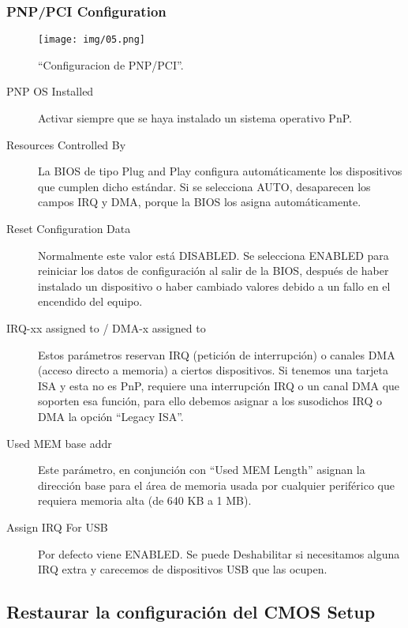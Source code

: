 		\subsubsection{PNP/PCI Configuration}{\label{sub:pnp/pci configuration}}
			\begin{figure}[H]
				\centering
					\texttt{[image: img/05.png]}
				\caption{``Configuracion de PNP/PCI''.}
			\end{figure}
			\begin{description}
				\item[PNP OS Installed] Activar siempre que se haya instalado un
					sistema operativo PnP. 
				\item[Resources Controlled By] La BIOS de tipo Plug and Play
					configura automáticamente los dispositivos que cumplen
					dicho estándar. Si se selecciona AUTO, desaparecen los
					campos IRQ y DMA, porque la BIOS los asigna
					automáticamente.
				\item[Reset Configuration Data] Normalmente este valor está
					DISABLED. Se selecciona ENABLED para reiniciar los datos de
					configuración al salir de la BIOS, después de haber
					instalado un dispositivo o haber cambiado valores debido a
					un fallo en el encendido del equipo.
				\item[IRQ-xx assigned to / DMA-x assigned to] Estos parámetros
					reservan IRQ (petición de interrupción) o canales DMA
					(acceso directo a memoria) a ciertos dispositivos. Si
					tenemos una tarjeta ISA y esta no es PnP, requiere una
					interrupción IRQ o un canal DMA que soporten esa función,
					para ello debemos asignar a los susodichos IRQ o DMA la
					opción “Legacy ISA”.
				\item[Used MEM base addr] Este parámetro, en conjunción con
					“Used MEM Length” asignan la dirección base para el área de
					memoria usada por cualquier periférico que requiera memoria
					alta (de 640 KB a 1 MB).
				\item[Assign IRQ For USB] Por defecto viene ENABLED. Se puede
					Deshabilitar si necesitamos alguna IRQ extra y carecemos de
					dispositivos USB que las ocupen.
			\end{description}

		\newpage

	\subsection{Restaurar la configuración del CMOS Setup}{\label{sec:cmossetup/resetear-el-cmos-setup}}

